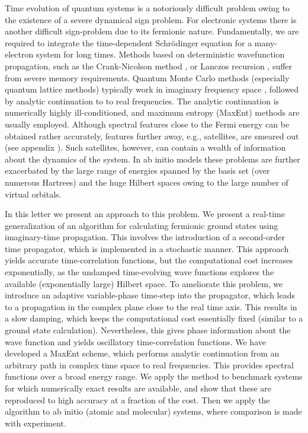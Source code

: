 \documentclass[aps,prl,twocolumn,showpacs,superscriptaddress,floatfix]{revtex4-1}
\def \Schrodinger {{Schr\"{o}dinger }}
\begin{document}
Time evolution of quantum systems is a notoriously difficult problem owing to the existence of a severe dynamical 
sign problem. For electronic systems there is another difficult sign-problem due to its fermionic nature. Fundamentally, we are required to integrate 
the time-dependent \Schrodinger equation for a many-electron system for long times. 
Methods based on deterministic wavefunction propagation, such as the Crank-Nicolson method \cite{CrankNicolson1947}, or 
Lanczos recursion \cite{Parlett,ParkLight1986}, suffer from severe memory requirements. 
Quantum Monte Carlo methods (especially quantum lattice methods)   
typically work in imaginary frequency space \cite{dca, continuoustime}, followed by analytic continuation to to real frequencies. The analytic continuation 
is numerically highly ill-conditioned, and maximum entropy (MaxEnt) methods \cite{maxent,Jarrell} are usually employed.
Although spectral features close to the Fermi energy can be obtained rather accurately, features 
further away, e.g., satellites, are smeared out (see appendix \cite{supplement}).
Such satellites, however, can contain a wealth of information about the dynamics of the system.
In ab initio models these problems are further exacerbated by the large range of energies spanned by the basis set 
(over numerous Hartrees) and the huge Hilbert spaces owing to the large number
of virtual orbitals.    

In this letter we present an approach to this problem. We present a real-time generalization of an algorithm for  
calculating  fermionic ground states using imaginary-time propagation. This involves the introduction of a second-order 
time propagator, which is implemented in a stochastic manner.
This approach yields accurate time-correlation functions, but 
the computational cost increases exponentially, as the undamped time-evolving wave functions explores the available (exponentially large) 
Hilbert space. To ameliorate this problem, we introduce an adaptive  
variable-phase time-step into the propagator, which leads to a propagation in
the complex plane close to the real time axis. This results in a slow damping, which keeps the computational cost essentially fixed (similar
to a ground state calculation). Nevertheless, this gives phase information about the wave function and yields oscillatory time-correlation functions. 
We have developed a MaxEnt scheme, which performs analytic continuation from an arbitrary path in complex time space
to real frequencies. This provides spectral functions over a broad energy range. 
We apply the method to benchmark systems for which numerically exact results are available, and show that these 
are reproduced to high accuracy at a fraction of the cost. Then we apply the algorithm to ab initio (atomic and molecular)
systems, where comparison is made with experiment. 
\end{document}
